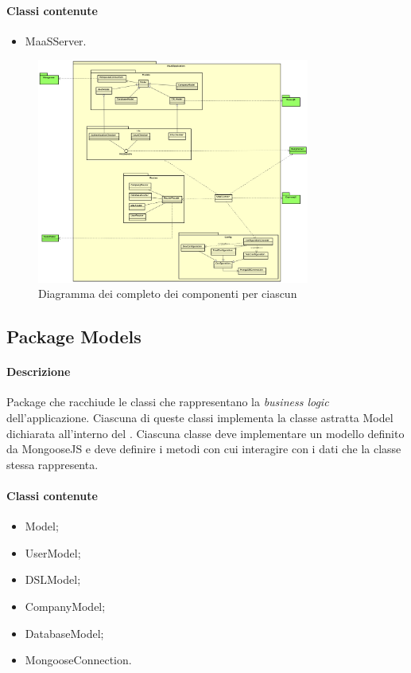 \paragraph*{Classi contenute}
\begin{itemize}
\item MaaSServer.
\end{itemize}

\begin{figure}[H]
\centering
\includegraphics[width=0.8\textwidth]{res/sections/backend/collegamenti.png}
\caption{Diagramma dei  completo dei componenti per ciascun }
\end{figure}

\subsection{Package Models}
\paragraph*{Descrizione}
Package che racchiude le classi che rappresentano la \textit{business logic} dell'applicazione. Ciascuna di queste classi implementa la classe astratta Model dichiarata all'interno del .
Ciascuna classe deve implementare un modello definito da MongooseJS e deve definire i metodi con cui interagire con i dati che la classe stessa rappresenta. \\

\paragraph*{Classi contenute}
\begin{itemize}
\item Model;
\item UserModel;
\item DSLModel;
\item CompanyModel;
\item DatabaseModel;
\item MongooseConnection.
\end{itemize}

